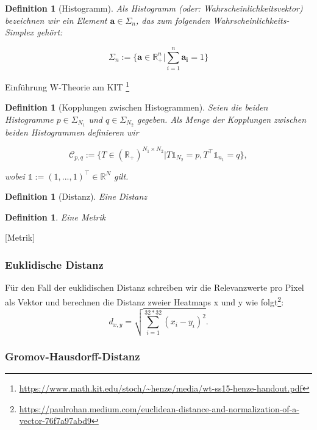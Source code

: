 \documentclass[twoside, 11pt,a4paper]{article}
\def\emph#1{\textit{#1}}
\newtheorem{definition}[theorem]{Definition}
\numberwithin{equation}{section}
\begin{document}
	\begin{definition}[Histogramm]
		Als Histogramm (oder: Wahrscheinlichkeitsvektor) bezeichnen wir ein Element $\boldsymbol{a} \in \Sigma_n$, das zum folgenden Wahrscheinlichkeits-Simplex gehört:
		
		\begin{equation*}
		\Sigma_n := \lbrace \boldsymbol{a} \in \mathbb{R}_{+}^n | \sum_{i=1}^n{\boldsymbol{a_i} = 1} \rbrace
		\end{equation*}
	\end{definition}
	
	Einführung W-Theorie am KIT \footnote{\url{https://www.math.kit.edu/stoch/~henze/media/wt-ss15-henze-handout.pdf}}
	\begin{definition}[Kopplungen zwischen Histogrammen]
		Seien die beiden Histogramme $p \in \Sigma_{N_1}$ und $q \in \Sigma_{N_2}$ gegeben.
		Als Menge der Kopplungen zwischen beiden Histogrammen definieren wir
		
		\begin{equation*}
		\mathcal{C}_{p,q} := \lbrace T \in (\mathbb{R}_+)^{N_1 \times N_2} | T \mathbb{1}_{N_2} = p, T^\top \mathbb{1}_{n_1} = q \rbrace,
		\end{equation*}	
		
		wobei $\mathbb{1} := (1,...,1)^\top \in \mathbb{R}^{N}$ gilt.
	\end{definition}
	
	
	\begin{definition}[Distanz]
		Eine \emph{Distanz}
	\end{definition}
	\begin{definition}
		Eine \emph{Metrik}
	\end{definition}[Metrik]
	
	
	
	\subsubsection{Euklidische Distanz} \label{l2dist}
	Für den Fall der euklidischen Distanz schreiben wir die Relevanzwerte pro Pixel als Vektor und berechnen die Distanz zweier Heatmaps x und y wie folgt\footnote{\url{https://paulrohan.medium.com/euclidean-distance-and-normalization-of-a-vector-76f7a97abd9}}:
	$$ d_{x,y} = \sqrt{\sum_{i=1}^{32 * 32}{(x_i -y_i)^2}}.$$
	
	\subsubsection{Gromov-Hausdorff-Distanz}
	
\end{document}

